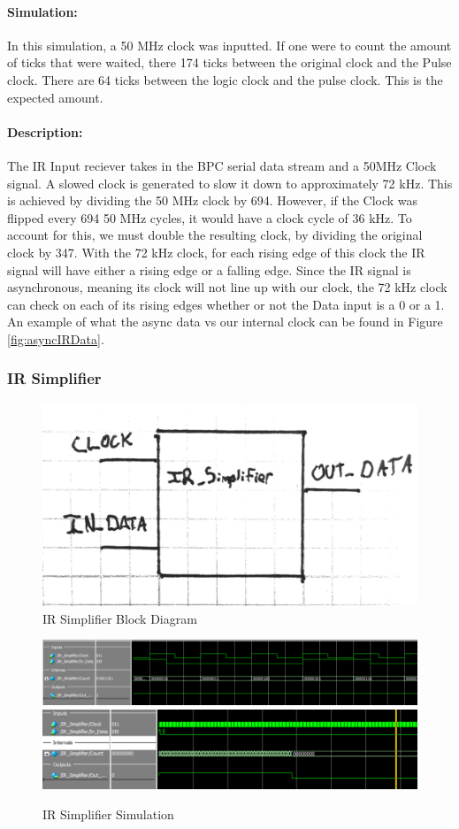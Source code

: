 \documentclass[]{article}
\begin{document}
\paragraph{Simulation:} In this simulation, a 50 MHz clock was inputted. If one were to count the amount of ticks that were waited, there 174 ticks between the original clock and the Pulse clock. There are 64 ticks between the logic clock and the pulse clock. This is the expected amount. 
\paragraph{Description:} The IR Input reciever takes in the BPC serial data stream and a 50MHz Clock signal. A slowed clock is generated to slow it down to approximately 72 kHz.
This is achieved by dividing the 50 MHz clock by 694. However, if the Clock was flipped every 694 50 MHz cycles, it would have a clock cycle of 36 kHz. 
To account for this, we must double the resulting clock, by dividing the original clock by 347.
With the 72 kHz clock, for each rising edge of this clock the IR signal will have either a rising edge or a falling edge. 
Since the IR signal is asynchronous, meaning its clock will not line up with our clock, the 72 kHz clock can check on each of its rising edges whether or not the Data input is a 0 or a 1.
An example of what the async data vs our internal clock can be found in Figure \ref{fig:asyncIRData}.

\subsubsection{IR Simplifier}
\begin{figure}[H]\centering
    \includegraphics[width=0.6\linewidth]{figures/IR_Simplifier_Block.jpg}
    \caption{IR Simplifier Block Diagram}
    \label{fig:irSimplifierBlock}
\end{figure}
\begin{figure}[H]\centering
    \includegraphics[width=\linewidth]{figures/IR_Simplifier_Sim1.png}
    \includegraphics[width=\linewidth]{figures/IR_Simplifier_Sim2.png}
    \caption{IR Simplifier Simulation}
    \label{fig:irSimplifierSim}
\end{figure}
\end{document}
